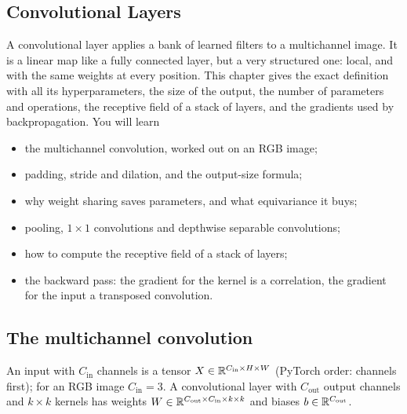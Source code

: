 \begin{notechapter}
\chapter{Convolutional Layers}\label{ch:convolutional-layers}

\begin{chapterintro}
A convolutional layer applies a bank of learned filters to a multichannel image. It is a
linear map like a fully connected layer, but a very structured one: local, and with the same
weights at every position. This chapter gives the exact definition with all its
hyperparameters, the size of the output, the number of parameters and operations, the
receptive field of a stack of layers, and the gradients used by backpropagation. You will
learn
\begin{itemize}[nosep]
  \item the multichannel convolution, worked out on an RGB image;
  \item padding, stride and dilation, and the output-size formula;
  \item why weight sharing saves parameters, and what equivariance it buys;
  \item pooling, $1\times1$ convolutions and depthwise separable convolutions;
  \item how to compute the receptive field of a stack of layers;
  \item the backward pass: the gradient for the kernel is a correlation, the gradient for the
        input a transposed convolution.
\end{itemize}
\end{chapterintro}

\section{The multichannel convolution}\label{convolutional-layers:sec:layer}

An input with $C_{\mathrm{in}}$ channels is a tensor $X\in\mathbb{R}^{C_{\mathrm{in}}\times H\times W}$ (PyTorch order: channels first); for an RGB
image $C_{\mathrm{in}} = 3$. A convolutional layer with $C_{\mathrm{out}}$ output channels and $k\times k$ kernels has weights
$W\in\mathbb{R}^{C_{\mathrm{out}}\times C_{\mathrm{in}}\times k\times k}$ and biases $b\in\mathbb{R}^{C_{\mathrm{out}}}$.


\end{notechapter}
